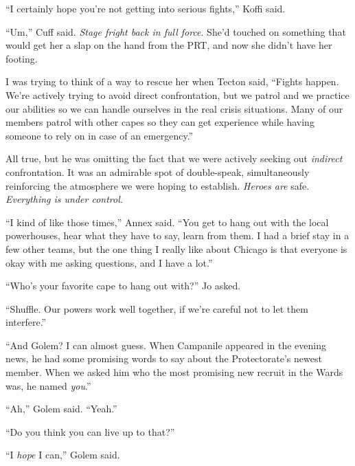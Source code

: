 ``I certainly hope you're not getting into serious fights,'' Koffi said.



``Um,'' Cuff said.  \emph{Stage fright back in full force}.  She'd touched on something that would get her a slap on the hand from the PRT, and now she didn't have her footing.



I was trying to think of a way to rescue her when Tecton said, ``Fights happen.  We're actively trying to avoid direct confrontation, but we patrol and we practice our abilities so we can handle ourselves in the real crisis situations.  Many of our members patrol with other capes so they can get experience while having someone to rely on in case of an emergency.''



All true, but he was omitting the fact that we were actively seeking out \emph{indirect} confrontation.  It was an admirable spot of double-speak, simultaneously reinforcing the atmosphere we were hoping to establish.  \emph{Heroes are} safe.  \emph{Everything is under control.}



``I kind of like those times,'' Annex said.  ``You get to hang out with the local powerhouses, hear what they have to say, learn from them.  I had a brief stay in a few other teams, but the one thing I really like about Chicago is that everyone is okay with me asking questions, and I have a lot.''



``Who's your favorite cape to hang out with?'' Jo asked.



``Shuffle.  Our powers work well together, if we're careful not to let them interfere.''



``And Golem?  I can almost guess.  When Campanile appeared in the evening news, he had some promising words to say about the Protectorate's newest member.  When we asked him who the most promising new recruit in the Wards was, he named \emph{you}.''



``Ah,'' Golem said.  ``Yeah.''



``Do you think you can live up to that?''



``I \emph{hope} I can,'' Golem said.




